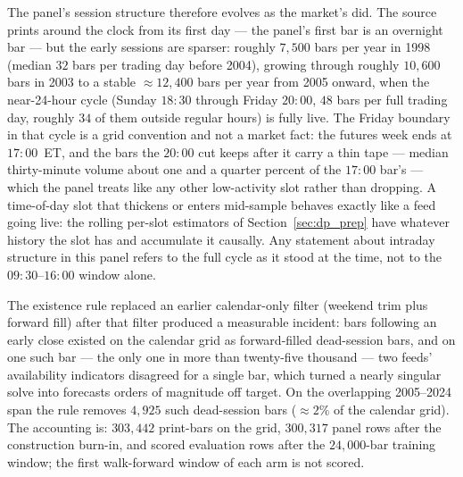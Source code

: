 The panel's session structure therefore evolves as the market's did. The
source prints around the clock from its first day --- the panel's first
bar is an overnight bar --- but the early sessions are sparser: roughly
$7{,}500$ bars per year in 1998 (median $32$ bars per trading day before
2004), growing through roughly $10{,}600$ bars in 2003 to a stable
$\approx 12{,}400$ bars per year from 2005 onward, when the near-24-hour
cycle (Sunday $18{:}30$ through Friday $20{:}00$, $48$ bars per full
trading day, roughly $34$ of them outside regular hours) is fully live.
The Friday boundary in that cycle is a grid convention and not a market
fact: the futures week ends at $17{:}00$~ET, and the bars the $20{:}00$
cut keeps after it carry a thin tape --- median thirty-minute volume
about one and a quarter percent of the $17{:}00$ bar's --- which the panel
treats like any other low-activity slot rather than dropping. A
time-of-day slot that thickens or enters mid-sample behaves exactly like
a feed going live: the rolling per-slot estimators of
Section~\ref{sec:dp_prep} have whatever history the slot has and
accumulate it causally. Any statement about intraday structure in this
panel refers to the full cycle as it stood at the time, not to the
$09{:}30$--$16{:}00$ window alone.

The existence rule replaced an earlier calendar-only filter (weekend trim
plus forward fill) after that filter produced a measurable incident: bars
following an early close existed on the calendar grid as forward-filled
dead-session bars, and on one such bar --- the only one in more than twenty-five
thousand --- two feeds' availability indicators disagreed for a single
bar, which turned a nearly singular solve into forecasts orders of magnitude off target. On the
overlapping 2005--2024 span the rule removes $4{,}925$ such dead-session
bars ($\approx 2\%$ of the calendar grid).
The accounting is: $303{,}442$ print-bars on the grid, $300{,}317$ panel
rows after the construction burn-in, and \unifAzeroN{} scored evaluation rows
after the $24{,}000$-bar training window; the first walk-forward window of
each arm is not scored.

